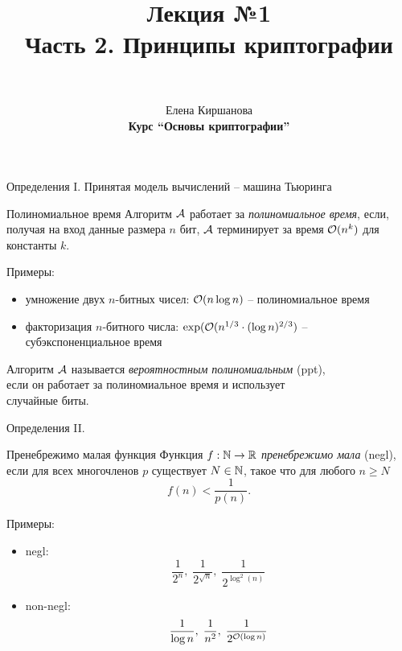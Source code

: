 \documentclass[usenames,dvipsnames,8pt,aspectratio=169]{beamer}
\author{\\ [10pt]
}
\title{Лекция №1 \\[10pt]
		Часть 2. Принципы криптографии}
\date{ Елена Киршанова \\  \textbf{Курс ``Основы криптографии''} \\  }
\begin{document}
	
\begin{frame}
	\titlepage
\end{frame}


\begin{frame}{Определения I.}
\Large 
Принятая модель вычислений -- машина Тьюринга \\
	\begin{block}{Полиномиальное время}
		Алгоритм $\mathcal{A}$ работает за \emph{полиномиальное время}, если, получая на вход данные размера  $n$ бит,  $\mathcal{A}$ терминирует за время $\mathcal{O}(n^k)$ для константы $k$.
	\end{block}
\vspace{10pt}
Примеры: 
\begin{itemize}
\LARGE
\item умножение двух $n$-битных чисел: $\mathcal{O}(n \log n)$ -- полиномиальное время
\item факторизация $n$-битного числа: $\exp(\mathcal{O}(n^{1/3}\cdot (\log n)^{2/3})$ -- субэкспоненциальное время
\end{itemize}
\vspace{10pt}
\Large

	 Алгоритм $\mathcal{A}$ называется \emph{вероятностным полиномиальным} (ppt), \\ если он работает за полиномиальное время и использует \\ случайные биты.

\end{frame}


\begin{frame} {Определения II.}
\Large
	\begin{block}{Пренебрежимо малая функция}
		Функция $f: {{\mathbb N}} \rightarrow {{\mathbb R}}$ \emph{пренебрежимо мала} (negl), если для всех многочленов $p$ существует $N \in {{\mathbb N}}$, такое что для любого $n \geq N$
		\[
			f(n) < \frac{1}{p(n)}.
		\]
	\end{block}

	\vspace{10pt}
	Примеры: 
	\begin{itemize}
		\LARGE
		\item negl:
		\[
		\frac{1}{2^n}, \; \frac{1}{2^{\sqrt{n}}}, \;  \frac{1}{2^{\log^2(n)}}
		\]
		\item non-negl:
			\[
		\frac{1}{\log n}, \;  \frac{1}{n^2}, \;  \frac{1}{2^{\mathcal{O}(\log n)}} 
		\]
	\end{itemize}
\end{frame}
\end{document}
